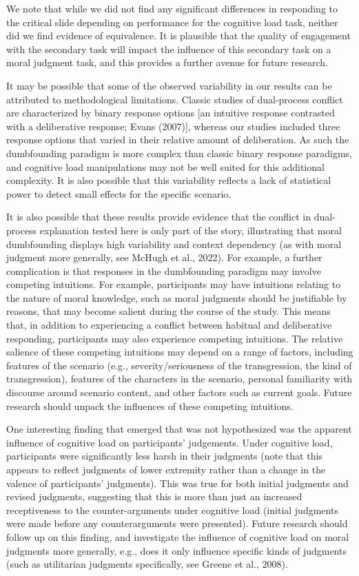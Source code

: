 \documentclass[
  man,floatsintext]{apa6}
\begin{document}
We note that while we did not find any significant differences in responding to the critical slide depending on performance for the cognitive load task, neither did we find evidence of equivalence. It is plausible that the quality of engagement with the secondary task will impact the influence of this secondary task on a moral judgment task, and this provides a further avenue for future research.

It may be possible that some of the observed variability in our results can be attributed to methodological limitations. Classic studies of dual-process conflict are characterized by binary response options {[}an intuitive response contrasted with a deliberative response; Evans (2007){]}, whereas our studies included three response options that varied in their relative amount of deliberation. As such the dumbfounding paradigm is more complex than classic binary response paradigms, and cognitive load manipulations may not be well suited for this additional complexity. It is also possible that this variability reflects a lack of statistical power to detect small effects for the specific scenario.

It is also possible that these results provide evidence that the conflict in dual-process explanation tested here is only part of the story, illustrating that moral dumbfounding displays high variability and context dependency (as with moral judgment more generally, see McHugh et al., 2022). For example, a further complication is that responses in the dumbfounding paradigm may involve competing intuitions. For example, participants may have intuitions relating to the nature of moral knowledge, such as moral judgments should be justifiable by reasons, that may become salient during the course of the study. This means that, in addition to experiencing a conflict between habitual and deliberative responding, participants may also experience competing intuitions. The relative salience of these competing intuitions may depend on a range of factors, including features of the scenario (e.g., severity/seriousness of the transgression, the kind of transgression), features of the characters in the scenario, personal familiarity with discourse around scenario content, and other factors such as current goals. Future research should unpack the influences of these competing intuitions.

One interesting finding that emerged that was not hypothesized was the apparent influence of cognitive load on participants' judgements. Under cognitive load, participants were significantly less harsh in their judgments (note that this appears to reflect judgments of lower extremity rather than a change in the valence of participants' judgments). This was true for both initial judgments and revised judgments, suggesting that this is more than just an increased receptiveness to the counter-arguments under cognitive load (initial judgments were made before any counterarguments were presented). Future research should follow up on this finding, and investigate the influence of cognitive load on moral judgments more generally, e.g., does it only influence specific kinds of judgments (such as utilitarian judgments specifically, see Greene et al., 2008).
\end{document}
